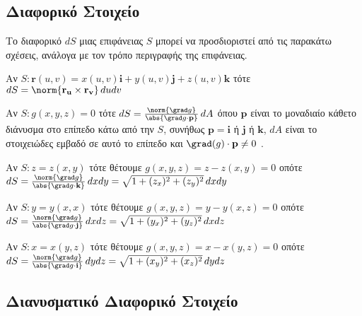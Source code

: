 \documentclass[a4paper,table]{report}
\begin{document}
\subsection*{Διαφορικό Στοιχείο}
 
\begin{dfn}
  Το διαφορικό $ dS $ μιας επιφάνειας $S$ μπορεί να προσδιοριστεί από τις παρακάτω 
  σχέσεις, ανάλογα με τον τρόπο περιγραφής της επιφάνειας.
  \begin{myitemize}
    \item Αν $ S\colon \mathbf{r}(u,v) = x(u,v)\mathbf{i}+y(u,v)\mathbf{j}+z(u,v)\mathbf{k} $ 
      τότε $ dS = \norm{\mathbf{r_{u}} \times \mathbf{r_{v}}} \, du dv $ 
    \item Αν $ S\colon g(x,y,z)=0 $ τότε $dS = \frac{\norm{\grad g}}{\abs{\grad g \cdot 
      \mathbf{p}}}\, dA $ όπου $ \mathbf{p} $ είναι το μοναδιαίο κάθετο διάνυσμα
      στο επίπεδο κάτω από την $S$, συνήθως $ \mathbf{p} = \mathbf{i} $ 
      ή $ \mathbf{j} $ ή $ \mathbf{k} $, $ dA $ είναι το στοιχειώδες εμβαδό σε αυτό το
      επίπεδο και $ \grad(g)\cdot \mathbf{p} \neq 0 $ .  
    \item Αν $ S\colon z=z(x,y) $ τότε θέτουμε $ g(x,y,z)=z-z(x,y)=0 $ οπότε $ dS =
      \frac{\norm{\grad g}}{\abs{\grad g \cdot \mathbf{k}}}\, dxdy = 
      \sqrt{1+(z_{x})^{2}+(z_{y})^{2}} \,dxdy $ 
    \item Αν $ S\colon y=y(x,x) $ τότε θέτουμε $ g(x,y,z)=y-y(x,z)=0 $ οπότε $ dS =
      \frac{\norm{\grad g}}{\abs{\grad g \cdot \mathbf{j}}}\, dxdz = 
      \sqrt{1+(y_{x})^{2}+(y_{z})^{2}} \,dxdz $ 
    \item Αν $ S\colon x=x(y,z) $ τότε θέτουμε $ g(x,y,z)=x-x(y,z)=0 $ οπότε $ dS =
      \frac{\norm{\grad g}}{\abs{\grad g \cdot \mathbf{i}}}\, dydz = 
      \sqrt{1+(x_{y})^{2}+(x_{z})^{2}} \,dydz $ 
  \end{myitemize}
\end{dfn}


\subsection*{Διανυσματικό Διαφορικό Στοιχείο}
\end{document}
